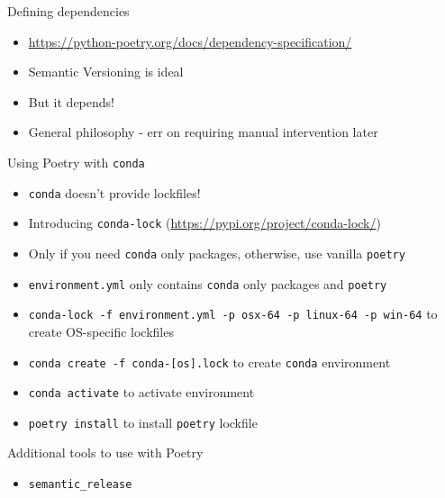 \documentclass[aspectratio=169]{beamer}
\begin{document}
\begin{frame}{Defining dependencies}
    \begin{itemize}
        \item \url{https://python-poetry.org/docs/dependency-specification/}
        \item Semantic Versioning is ideal
        \item But it depends!
        \item General philosophy - err on requiring manual intervention later
    \end{itemize}
\end{frame}
\begin{frame}{Using Poetry with \protect\lstinline!conda!}
    \begin{itemize}
        \item \lstinline!conda! doesn't provide lockfiles!
        \item Introducing \lstinline!conda-lock! (\url{https://pypi.org/project/conda-lock/})
        \item Only if you need \lstinline!conda! only packages, otherwise, use vanilla \lstinline!poetry!
        \item \lstinline!environment.yml! only contains \lstinline!conda! only packages and \lstinline!poetry!
        \item \lstinline!conda-lock -f environment.yml -p osx-64 -p linux-64 -p win-64! to create OS-specific lockfiles
        \item \lstinline!conda create -f conda-[os].lock! to create \lstinline!conda! environment
        \item \lstinline!conda activate! to activate environment
        \item \lstinline!poetry install! to install \lstinline!poetry! lockfile
    \end{itemize}
\end{frame}
\begin{frame}{Additional tools to use with Poetry}
    \begin{itemize}
        \item \lstinline!semantic_release!
    \end{itemize}
\end{frame}
\end{document}
